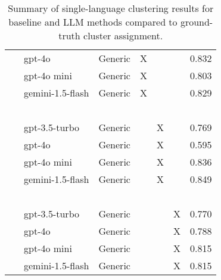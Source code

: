 \begin{table*}[ht!]
\begin{tabular}{l|l|cccc|r}
        ~                     & gpt-4o            & Generic               & X              & ~                  & ~                    & 0.832 \\
        ~                     & gpt-4o mini       & Generic               & X              & ~                  & ~                    & 0.803 \\
        ~                     & gemini-1.5-flash  & Generic               & X              & ~                  & ~                    & 0.829 \\
        ~                     & ~                 & ~                      & ~              & ~                  & ~                    & ~   \\
        ~                     & gpt-3.5-turbo     & Generic               & ~              & X                  & ~                    & 0.769 \\
        ~                     & gpt-4o            & Generic               & ~              & X                  & ~                    & 0.595 \\
        ~                     & gpt-4o mini       & Generic               & ~              & X                  & ~                    & 0.836 \\
        ~                     & gemini-1.5-flash  & Generic               & ~              & X                  & ~                    & 0.849 \\
        ~                     & ~                 & ~                      & ~              & ~                  & ~                    & ~   \\
        ~                     & gpt-3.5-turbo     & Generic               & ~              & ~                  & X                    & 0.770 \\
        ~                     & gpt-4o            & Generic               & ~              & ~                  & X                    & 0.788 \\
        ~                     & gpt-4o mini       & Generic               & ~              & ~                  & X                    & 0.815 \\
        ~                     & gemini-1.5-flash  & Generic               & ~              & ~                  & X                    & 0.815 \\

    \end{tabular}
    \caption{Summary of single-language clustering results for baseline and LLM methods compared to ground-truth cluster assignment.}
    \label{tab:single-lang-results}
\end{table*}



